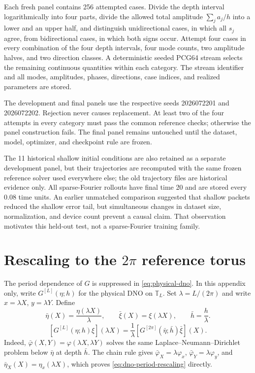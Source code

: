 \documentclass[11pt]{article}
\newcommand{\T}{\mathbb T}
\begin{document}
Each fresh panel contains 256 attempted cases.  Divide the depth interval
logarithmically into four parts, divide the allowed total amplitude
\(\sum_j a_j/h\) into a lower and an upper half, and distinguish
unidirectional cases, in which all \(s_j\) agree, from bidirectional cases,
in which both signs occur.  Attempt four cases in every combination of the
four depth intervals, four mode counts, two amplitude halves, and two
direction classes.  A deterministic seeded PCG64 stream selects the remaining
continuous quantities within each category.  The stream identifier and all modes,
amplitudes, phases, directions, case indices, and realized parameters are
stored.

The development and final panels use the respective seeds 2026072201 and
2026072202.  Rejection never causes replacement.  At least two of the four
attempts in every category must pass the common reference checks; otherwise the
panel construction fails.  The final panel remains untouched until the
dataset, model, optimizer, and checkpoint rule are frozen.

The 11 historical shallow initial conditions are also retained as a separate
development panel, but their trajectories are recomputed with the same frozen
reference solver used everywhere else; the old trajectory files are
historical evidence only.  All sparse-Fourier rollouts have final time 20 and
are stored every 0.08 time units.  An earlier unmatched comparison suggested
that shallow packets reduced the shallow error tail, but simultaneous changes
in dataset size, normalization, and device count prevent a causal claim.  That
observation motivates this held-out test, not a sparse-Fourier training
family.
\section{Rescaling to the \texorpdfstring{$2\pi$}{2pi} reference torus}
\label{app:dno-rescaling}

The period dependence of $G$ is suppressed in
\eqref{eq:physical-dno}.  In this appendix only, write
$G^{[L]}(\eta;h)$ for the physical DNO on $\T_L$.  Set
$\lambda=L/(2\pi)$ and write $x=\lambda X$, $y=\lambda Y$.  Define
\begin{equation}
  \bar\eta(X)=\frac{\eta(\lambda X)}{\lambda},
  \qquad
  \bar\xi(X)=\xi(\lambda X),
  \qquad
  \bar h=\frac{h}{\lambda}.
  \label{eq:rescaled-dno-data}
\end{equation}
\begin{equation}
  \boxed{
  [G^{[L]}(\eta;h)\xi](\lambda X)
  =\frac1\lambda
   [G^{[2\pi]}(\bar\eta;\bar h)\bar\xi](X).
  }
  \label{eq:dno-period-rescaling}
\end{equation}
Indeed, $\bar\varphi(X,Y)=\varphi(\lambda X,\lambda Y)$ solves the same
Laplace--Neumann--Dirichlet problem below $\bar\eta$ at depth $\bar h$.
The chain rule gives $\bar\varphi_X=\lambda\varphi_x$,
$\bar\varphi_Y=\lambda\varphi_y$, and
$\bar\eta_X(X)=\eta_x(\lambda X)$, which proves
\eqref{eq:dno-period-rescaling} directly.
\end{document}

